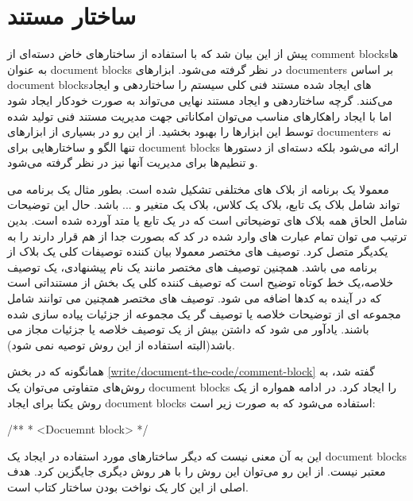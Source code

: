 
\section{ساختار مستند}

پیش از این بیان شد که با استفاده از ساختارهای خاض دسته‌ای از \glspl{comment
block}ها به عنوان \glspl{document block} در نظر گرفته می‌شود. ابزارهای
\glspl{documenter} بر اساس \glspl{document block}های ایجاد شده مستند فنی کلی
سیستم را ساختاردهی و ایجاد می‌کنند. گرچه ساختاردهی و ایجاد مستند نهایی می‌تواند
به صورت خودکار ایجاد شود اما با ایجاد راهکارهای مناسب می‌توان امکاناتی جهت
مدیریت مستند فنی تولید شده توسط این ابزارها را بهبود بخشید. از این رو در بسیاری
از ابزارهای \glspl{documenter} نه تنها الگو و ساختارهایی برای \glspl{document
block} ارائه می‌شود بلکه دسته‌ای از دستورها و تنطیم‌ها برای مدیریت آنها نیز در
نظر گرفته می‌شود.


معمولا یک برنامه از بلاک های مختلفی تشکیل شده است. بطور مثال یک برنامه می تواند
شامل بلاک یک تابع، بلاک یک کلاس، بلاک یک متغیر و ... باشد. حال این توضیحات شامل
الحاق همه بلاک های توضیحاتی است که در یک تابع یا متد آورده شده است. بدین ترتیب
می توان تمام عبارت های وارد شده در کد که بصورت جدا از هم قرار دارند را به یکدیگر
متصل کرد. توصیف های مختصر معمولا بیان کننده توصیفات کلی یک بلاک از برنامه می
باشد. همچنین توصیف های مختصر مانند یک نام پیشنهادی، یک توصیف خلاصه،یک خط کوتاه
توضیح است که توصیف کننده کلی یک بخش از مستنداتی است که در آینده به کدها اضافه می
شود. توصیف های مختصر همچنین می توانند شامل مجموعه ای از توضیحات خلاصه یا توصیف
گر یک مجموعه از جزئیات پیاده سازی شده باشند. یادآور می شود که داشتن بیش از یک
توصیف خلاصه یا جزئیات مجاز می باشد(البته استفاده از این روش توصیه نمی شود).

\begin{note}
همانگونه که در بخش \ref{write/document-the-code/comment-block} گفته شد، به
روش‌های متفاوتی می‌توان یک \glspl{document block} را ایجاد کرد. در ادامه همواره
از یک روش یکتا برای ایجاد \glspl{document block} استفاده می‌شود که به صورت زیر
است:

\begin{Java}
/**
 * <Docuemnt block>
 */
\end{Java}

این به آن معنی نیست که دیگر ساختارهای مورد استفاده در ایجاد یک \glspl{document
block} معتبر نیست. از این رو می‌توان این روش را با هر روش دیگری جایگزین کرد. هدف
اصلی از این کار یک نواخت بودن ساختار کتاب است.
\end{note}

